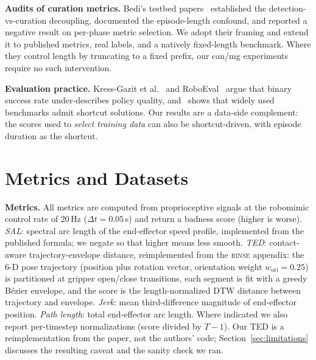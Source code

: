 \documentclass[10pt]{article}
\newcommand{\rinse}{\textsc{rinse}}
\begin{document}
\textbf{Audits of curation metrics.} Bedi's testbed
papers~\citep{bedi-audit,bedi-policy,bedi-phase} established the
detection-vs-curation decoupling, documented the episode-length confound, and
reported a negative result on per-phase metric selection. We adopt their
framing and extend it to published metrics, real labels, and a natively
fixed-length benchmark. Where they control length by truncating to a fixed
prefix, our can/mg experiments require no such intervention.

\textbf{Evaluation practice.} Kress-Gazit et
al.~\citep{empirical-science} and RoboEval~\citep{roboeval} argue that binary
success rate under-describes policy quality, and~\citep{benchmarking-audit}
shows that widely used benchmarks admit shortcut solutions. Our results are a
data-side complement: the scores used to \emph{select training data} can also
be shortcut-driven, with episode duration as the shortcut.

\section{Metrics and Datasets}
\label{sec:setup}

\textbf{Metrics.} All metrics are computed from proprioceptive signals at the
robomimic control rate of 20\,Hz ($\Delta t = 0.05$\,s) and return a badness
score (higher is worse). \emph{SAL}: spectral arc length of the end-effector
speed profile, implemented from the published formula; we negate so that
higher means less smooth. \emph{TED}: contact-aware trajectory-envelope
distance, reimplemented from the \rinse{} appendix: the 6-D pose trajectory
(position plus rotation vector, orientation weight $w_{\mathrm{ori}} =
0.25$) is partitioned at gripper open/close transitions, each segment is fit
with a greedy B\'ezier envelope, and the score is the length-normalized DTW
distance between trajectory and envelope. \emph{Jerk}: mean third-difference
magnitude of end-effector position. \emph{Path length}: total end-effector
arc length. Where indicated we also report per-timestep normalizations
(score divided by $T{-}1$). Our TED is a reimplementation from the paper, not
the authors' code; Section~\ref{sec:limitations} discusses the resulting
caveat and the sanity check we ran.
\end{document}

